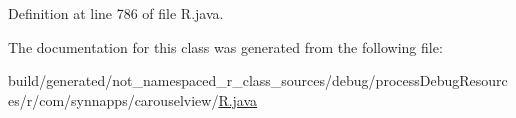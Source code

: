 Definition at line 786 of file R.\+java.



The documentation for this class was generated from the following file\+:\begin{DoxyCompactItemize}
\item 
build/generated/not\+\_\+namespaced\+\_\+r\+\_\+class\+\_\+sources/debug/process\+Debug\+Resources/r/com/synnapps/carouselview/\mbox{\hyperlink{com_2synnapps_2carouselview_2_r_8java}{R.\+java}}\end{DoxyCompactItemize}
